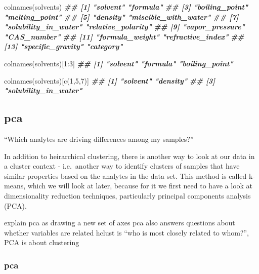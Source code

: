 \documentclass[
]{krantz}
\newenvironment{Shaded}{\begin{snugshade}}{\end{snugshade}}
\newcommand{\DecValTok}[1]{\textcolor[rgb]{0.00,0.00,0.81}{#1}}
\newcommand{\DocumentationTok}[1]{\textcolor[rgb]{0.56,0.35,0.01}{\textbf{\textit{#1}}}}
\newcommand{\FunctionTok}[1]{\textcolor[rgb]{0.00,0.00,0.00}{#1}}
\newcommand{\NormalTok}[1]{#1}
\newcommand{\SpecialCharTok}[1]{\textcolor[rgb]{0.00,0.00,0.00}{#1}}
\begin{document}
\begin{Shaded}
\begin{Highlighting}[]
\FunctionTok{colnames}\NormalTok{(solvents)}
\DocumentationTok{\#\#  [1] "solvent"             "formula"            }
\DocumentationTok{\#\#  [3] "boiling\_point"       "melting\_point"      }
\DocumentationTok{\#\#  [5] "density"             "miscible\_with\_water"}
\DocumentationTok{\#\#  [7] "solubility\_in\_water" "relative\_polarity"  }
\DocumentationTok{\#\#  [9] "vapor\_pressure"      "CAS\_number"         }
\DocumentationTok{\#\# [11] "formula\_weight"      "refractive\_index"   }
\DocumentationTok{\#\# [13] "specific\_gravity"    "category"}

\FunctionTok{colnames}\NormalTok{(solvents)[}\DecValTok{1}\SpecialCharTok{:}\DecValTok{3}\NormalTok{]}
\DocumentationTok{\#\# [1] "solvent"       "formula"       "boiling\_point"}

\FunctionTok{colnames}\NormalTok{(solvents)[}\FunctionTok{c}\NormalTok{(}\DecValTok{1}\NormalTok{,}\DecValTok{5}\NormalTok{,}\DecValTok{7}\NormalTok{)]}
\DocumentationTok{\#\# [1] "solvent"             "density"            }
\DocumentationTok{\#\# [3] "solubility\_in\_water"}
\end{Highlighting}
\end{Shaded}

\hypertarget{pca}{%
\subsection{pca}\label{pca}}

``Which analytes are driving differences among my samples?''

In addition to heirarchical clustering, there is another way to look at our data in a cluster context - i.e.~another way to identify clusters of samples that have similar properties based on the analytes in the data set. This method is called k-means, which we will look at later, because for it we first need to have a look at dimensionality reduction techniques, particularly principal components analysis (PCA).

explain pca as drawing a new set of axes
pca also answers questions about whether variables are related
hclust is ``who is most closely related to whom?'', PCA is about clustering

\hypertarget{pca-1}{%
\subsubsection{pca}\label{pca-1}}
\end{document}
